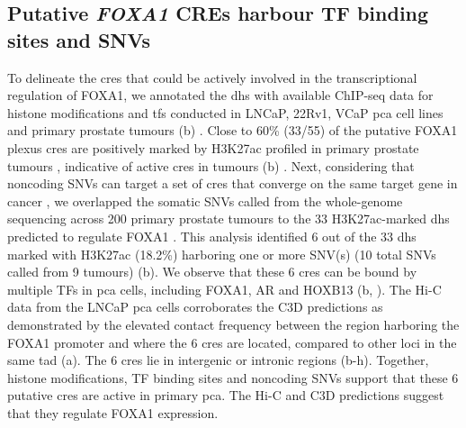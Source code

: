 
\subsection{Putative \emph{FOXA1} CREs harbour TF binding sites and SNVs}

To delineate the \glspl{cre} that could be actively involved in the transcriptional regulation of FOXA1, we annotated the \gls{dhs} with available ChIP-seq data for histone modifications and \glspl{tf} conducted in LNCaP, 22Rv1, VCaP \gls{pca} cell lines and primary prostate tumours (b) \cite{pomerantzAndrogenReceptorCistrome2015,kronTMPRSS2ERGFusion2017}.
Close to 60\% (33/55) of the putative FOXA1 plexus \glspl{cre} are positively marked by H3K27ac profiled in primary prostate tumours \cite{kronTMPRSS2ERGFusion2017}, indicative of active \glspl{cre} in tumours (b) \cite{creyghtonHistoneH3K27acSeparates2010}.
Next, considering that noncoding SNVs can target a set of \glspl{cre} that converge on the same target gene in cancer \cite{baileyNoncodingSomaticInherited2016}, we overlapped the somatic SNVs called from the whole-genome sequencing across 200 primary prostate tumours to the 33 H3K27ac-marked \gls{dhs} predicted to regulate FOXA1 \cite{fraserGenomicHallmarksLocalized2017,espirituEvolutionaryLandscapeLocalized2018}.
This analysis identified 6 out of the 33 \gls{dhs} marked with H3K27ac (18.2\%) harboring one or more SNV(s) (10 total SNVs called from 9 tumours) (b).
We observe that these 6 \glspl{cre} can be bound by multiple TFs in \gls{pca} cells, including FOXA1, AR and HOXB13 (b, ).
The Hi-C data from the LNCaP \gls{pca} cells corroborates the C3D predictions as demonstrated by the elevated contact frequency between the region harboring the FOXA1 promoter and where the 6 \glspl{cre} are located, compared to other loci in the same \gls{tad} (a).
The 6 \glspl{cre} lie in intergenic or intronic regions (b-h).
Together, histone modifications, TF binding sites and noncoding SNVs support that these 6 putative \glspl{cre} are active in primary \gls{pca}.
The Hi-C and C3D predictions suggest that they regulate FOXA1 expression.

